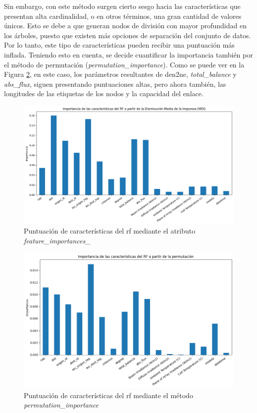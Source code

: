 Sin embargo, con este método surgen cierto sesgo hacia las características que presentan alta cardinalidad, o en otros términos, una gran cantidad de valores únicos. Esto se debe a que generan nodos de división con mayor profundidad en los árboles, puesto que existen más opciones de separación del conjunto de datos. Por lo tanto, este tipo de características pueden recibir una puntuación más inflada. Teniendo esto en cuenta, se decide cuantificar la importancia también por el método de permutación (\textit{permutation\_importance}). Como se puede ver en la Figura \ref{fig:imp2}, en este caso, los parámetros resultantes de \gls{den2ne}, \textit{total\_balance} y \textit{abs\_flux}, siguen presentando puntuaciones altas, pero ahora también, las longitudes de las etiquetas de los nodos y la capacidad del enlace. \cite{importance}

\begin{figure}[H]
  \centering
  \includegraphics[width=1\textwidth]{img/desarrollo/rf/importance1.png}
  \caption{Puntuación de características del \acrshort{rf} mediante el atributo \textit{feature\_importances\_}}
  \label{fig:imp1}
\end{figure}

\begin{figure}[H]
  \centering
  \includegraphics[width=1\textwidth]{img/desarrollo/rf/importance2.png}
  \caption{Puntuación de características del \acrshort{rf} mediante el método \textit{permutation\_importance}}
  \label{fig:imp2}
\end{figure}

